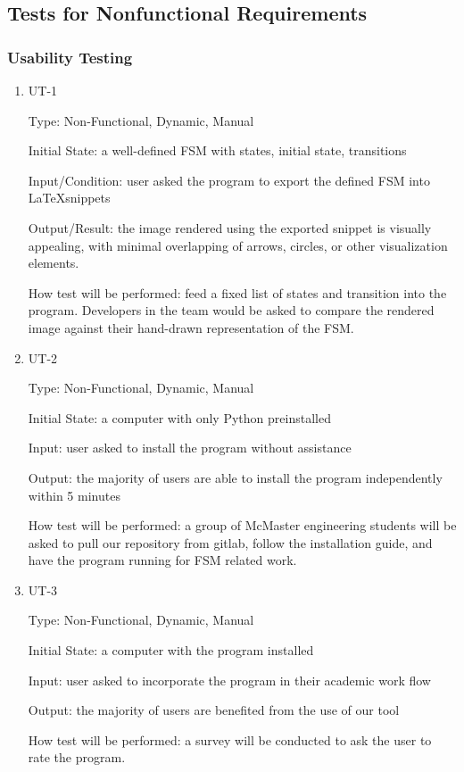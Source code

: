 \documentclass[12pt, titlepage]{article}
\begin{document}
\subsection{Tests for Nonfunctional Requirements}

\subsubsection{Usability Testing}

\begin{enumerate}

\item{UT-1\\}

  Type: Non-Functional, Dynamic, Manual
  
  Initial State: a well-defined FSM with states, initial state, transitions
  
  Input/Condition: user asked the program to export the defined FSM into \LaTeX snippets

  Output/Result: the image rendered using the exported snippet is visually
  appealing, with minimal overlapping of arrows, circles, or other visualization
  elements.
  
  How test will be performed: feed a fixed list of states and transition into the
  program. Developers in the team would be asked to compare the rendered image
  against their hand-drawn representation of the FSM.
  
\item{UT-2\\}

  Type: Non-Functional, Dynamic, Manual
  
  Initial State: a computer with only Python preinstalled
  
  Input: user asked to install the program without assistance
  
  Output: the majority of users are able to install the program independently
  within 5 minutes
  
  How test will be performed: a group of McMaster engineering students will be
  asked to pull our repository from gitlab, follow the installation guide, and
  have the program running for FSM related work.

\item{UT-3\\}

  Type: Non-Functional, Dynamic, Manual
  
  Initial State: a computer with the program installed
  
  Input: user asked to incorporate the program in their academic work flow
  
  Output: the majority of users are benefited from the use of our tool
  
  How test will be performed: a survey will be conducted to ask the user to rate
  the program.

\end{enumerate}
\end{document}
